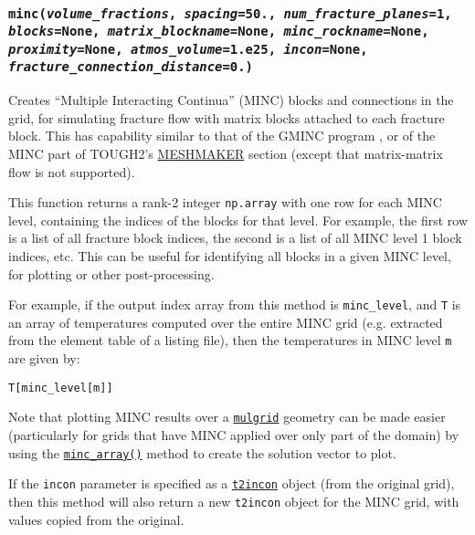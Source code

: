 \begin{snugshade}
\subsubsection{\texttt{minc(\emph{volume\_fractions}, \emph{spacing}=50., \emph{num\_fracture\_planes}=1,\\
    \emph{blocks}=None, \emph{matrix\_blockname}=None, \emph{minc\_rockname}=None,\\
    \emph{proximity}=None, \emph{atmos\_volume}=1.e25, \emph{incon}=None,\\
    \emph{fracture\_connection\_distance}=0.)}}
\end{snugshade}
\label{sec:t2grid:MINC}

Creates ``Multiple Interacting Continua'' (MINC) blocks and connections in the grid, for simulating fracture flow with matrix blocks attached to each fracture block. This has capability similar to that of the GMINC program \citep{GMINC}, or of the MINC part of TOUGH2's \hyperref[sec:t2data:meshmaker]{MESHMAKER} section (except that matrix-matrix flow is not supported).

This function returns a rank-2 integer \texttt{np.array} with one row for each MINC level, containing the indices of the blocks for that level. For example, the first row is a list of all fracture block indices, the second is a list of all MINC level 1 block indices, etc. This can be useful for identifying all blocks in a given MINC level, for plotting or other post-processing.

For example, if the output index array from this method is \texttt{minc\_level}, and \texttt{T} is an array of temperatures computed over the entire MINC grid (e.g. extracted from the element table of a listing file), then the temperatures in MINC level \texttt{m} are given by:

\begin{lstlisting}
T[minc_level[m]]
\end{lstlisting}

Note that plotting MINC results over a \hyperref[mulgrids]{\texttt{mulgrid}} geometry can be made easier (particularly for grids that have MINC applied over only part of the domain) by using the \hyperref[sec:mulgrid:minc_array]{\texttt{minc\_array()}} method to create the solution vector to plot.

If the \texttt{incon} parameter is specified as a \hyperref[incons]{\texttt{t2incon}} object (from the original grid), then this method will also return a new \texttt{t2incon} object for the MINC grid, with values copied from the original.

